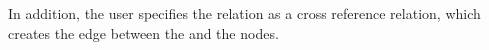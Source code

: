 In addition, the user specifies the  relation as a cross reference relation, which creates
the edge between the  and the  nodes. 


